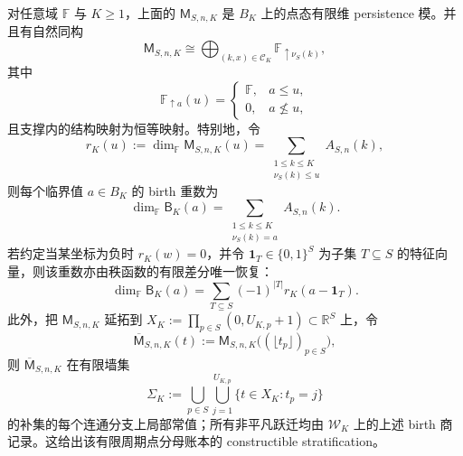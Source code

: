 \begin{theorem}\label{distill:persistent_homology_persistence_modules_and_constructible_sheaf_persistence-constructible_jump_stratification-finite-periodic-denominator-constructible-stratification}
对任意域 \(\mathbb F\) 与 \(K\ge1\)，上面的 \(\mathsf M_{S,n,K}\) 是 \(B_K\) 上的点态有限维 persistence 模。并且有自然同构
\[
\mathsf M_{S,n,K}\cong
\bigoplus_{(k,x)\in\mathcal C_K}\mathbb F_{\uparrow \nu_S(k)},
\]
其中
\[
\mathbb F_{\uparrow a}(u)=
\begin{cases}
\mathbb F,& a\le u,\\
0,& a\nleq u,
\end{cases}
\]
且支撑内的结构映射为恒等映射。特别地，令
\[
r_K(u):=\dim_{\mathbb F}\mathsf M_{S,n,K}(u)
=\sum_{\substack{1\le k\le K\\ \nu_S(k)\le u}}A_{S,n}(k),
\]
则每个临界值 \(a\in B_K\) 的 birth 重数为
\[
\dim_{\mathbb F}\mathsf B_K(a)
=\sum_{\substack{1\le k\le K\\ \nu_S(k)=a}}A_{S,n}(k).
\]
若约定当某坐标为负时 \(r_K(w)=0\)，并令 \(\mathbf 1_T\in\{0,1\}^S\) 为子集 \(T\subseteq S\) 的特征向量，则该重数亦由秩函数的有限差分唯一恢复：
\[
\dim_{\mathbb F}\mathsf B_K(a)
=\sum_{T\subseteq S}(-1)^{|T|}r_K(a-\mathbf 1_T).
\]
此外，把 \(\mathsf M_{S,n,K}\) 延拓到
\(X_K:=\prod_{p\in S}(0,U_{K,p}+1)\subset\mathbb R^S\) 上，令
\[
\overline{\mathsf M}_{S,n,K}(t):=\mathsf M_{S,n,K}\bigl((\lfloor t_p\rfloor)_{p\in S}\bigr),
\]
则 \(\overline{\mathsf M}_{S,n,K}\) 在有限墙集
\[
\Sigma_K:=\bigcup_{p\in S}\bigcup_{j=1}^{U_{K,p}}\{t\in X_K:t_p=j\}
\]
的补集的每个连通分支上局部常值；所有非平凡跃迁均由 \(\mathcal W_K\) 上的上述 birth 商记录。这给出该有限周期点分母账本的 constructible stratification。
\end{theorem}

